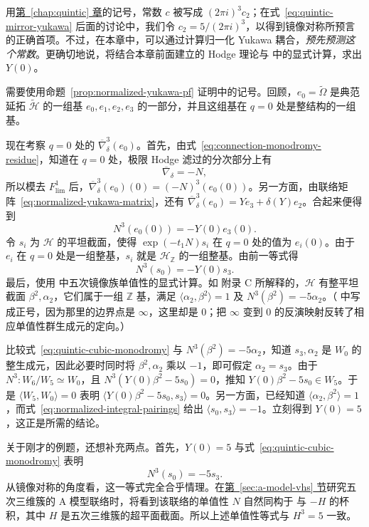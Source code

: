 \begin{example}
用\hyperref[chap:quintic]{第~\ref*{chap:quintic} 章}的记号，常数 $c$ 被写成 $(2\pi i)^3c_2$；在式~\eqref{eq:quintic-mirror-yukawa} 后面的讨论中，我们令 $c_2=5/(2\pi i)^3$，以得到镜像对称所预言的正确首项。不过，在本章中，可以通过计算归一化 Yukawa 耦合，\emph{预先预测这个常数}。更确切地说，将结合本章前面建立的 Hodge 理论与  中的显式计算，求出 $Y(0)$。

需要使用命题~\ref{prop:normalized-yukawa-pf} 证明中的记号。回顾，$e_0=\widetilde\Omega$ 是典范延拓 $\widetilde{\mathcal H}$ 的一组基 $e_0,e_1,e_2,e_3$ 的一部分，并且这组基在 $q=0$ 处是整结构的一组基。

现在考察 $q=0$ 处的 $\overline\nabla_\delta^3(e_0)$。首先，由式~\eqref{eq:connection-monodromy-residue}，知道在 $q=0$ 处，极限 Hodge 滤过的分次部分上有
\[
\overline\nabla_\delta=-N,
\]
所以模去 $F_{\mathrm{lim}}^1$ 后，$\overline\nabla_\delta^3(e_0)(0)=(-N)^3(e_0(0))$。另一方面，由联络矩阵~\eqref{eq:normalized-yukawa-matrix}，还有 $\overline\nabla_\delta^3(e_0)=Ye_3+\delta(Y)e_2$。合起来便得到
\[
N^3(e_0(0))=-Y(0)e_3(0).
\]
令 $s_i$ 为 $\mathcal H$ 的平坦截面，使得 $\exp(-t_1N)s_i$ 在 $q=0$ 处的值为 $e_i(0)$。由于 $e_i$ 在 $q=0$ 处是一组整基，$s_i$ 就是 $\mathcal H_{\mathbb Z}$ 的一组整基。由前一等式得
\begin{equation}\label{eq:quintic-cubic-monodromy}
N^3(s_0)=-Y(0)s_3.
\end{equation}
最后，使用  中五次镜像族单值性的显式计算。如  附录 C 所解释的，$\mathcal H$ 有整平坦截面 $\beta^2,\alpha_2$，它们属于一组 $\mathbb Z$ 基，满足 $\langle\alpha_2,\beta^2\rangle=1$ 及 $N^3(\beta^2)=-5\alpha_2$。（ 中写成正号，因为那里的边界点是 $\infty$，这里却是 $0$；把 $\infty$ 变到 $0$ 的反演映射反转了相应单值性群生成元的定向。）

比较式~\eqref{eq:quintic-cubic-monodromy} 与 $N^3(\beta^2)=-5\alpha_2$，知道 $s_3,\alpha_2$ 是 $W_0$ 的整生成元，因此必要时同时将 $\beta^2,\alpha_2$ 乘以 $-1$，即可假定 $\alpha_2=s_3$。由于 $N^3:W_6/W_5\simeq W_0$，且 $N^3(Y(0)\beta^2-5s_0)=0$，推知 $Y(0)\beta^2-5s_0\in W_5$。于是 $\langle W_5,W_0\rangle=0$ 表明
$\langle Y(0)\beta^2-5s_0,s_3\rangle=0$。另一方面，已经知道 $\langle\alpha_2,\beta^2\rangle=1$，而式~\eqref{eq:normalized-integral-pairings} 给出 $\langle s_0,s_3\rangle=-1$。立刻得到 $Y(0)=5$，这正是所需的结论。
\end{example}

关于刚才的例题，还想补充两点。首先，$Y(0)=5$ 与式~\eqref{eq:quintic-cubic-monodromy} 表明
\[
N^3(s_0)=-5s_3.
\]
从镜像对称的角度看，这一等式完全合乎情理。在\hyperref[sec:a-model-vhs]{第~\ref*{sec:a-model-vhs} 节}研究五次三维簇的 A 模型联络时，将看到该联络的单值性 $N$ 自然同构于
与 $-H$ 的杯积，其中 $H$ 是五次三维簇的超平面截面。所以上述单值性等式与 $H^3=5$ 一致。

